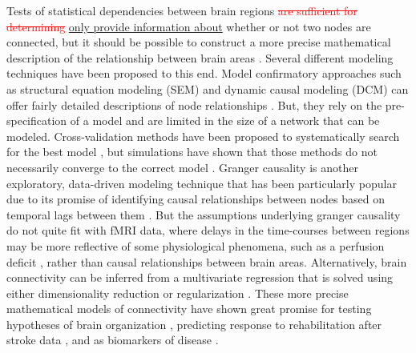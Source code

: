 \documentclass{bmcart}
\newcommand{\ADDED}[1]{\textcolor{markercolor}{\uline{#1}}}
\newcommand{\DELETED}[1]{\textcolor{red}{\sout{#1}}}
\begin{document}
Tests of statistical dependencies between brain regions \DELETED{are sufficient for determining} \ADDED{only provide information about} whether or not two nodes are connected, but it should be possible to construct a more precise mathematical description of the relationship between brain areas \cite{Friston1994}. Several different modeling techniques have been proposed to this end. Model confirmatory approaches such as structural equation modeling (SEM) \cite{Buchel1997} and dynamic causal modeling (DCM) \cite{Friston2003} can offer fairly detailed descriptions of node relationships . But, they rely on the pre-specification of a model and are limited in the size of a network that can be modeled. Cross-validation methods have been proposed to systematically search for the best model \cite{Zhuang2005,Penny2010,James2009}, but simulations have shown that those methods do not necessarily converge to the correct model \cite{Lohmann2012}. Granger causality is another exploratory, data-driven modeling technique that has been particularly popular due to its promise of identifying causal relationships between nodes based on temporal lags between them \cite{Deshpande2011}. But the assumptions underlying granger causality do not quite fit with fMRI data\cite{Smith2011}, where delays in the time-courses between regions may be more reflective of some physiological phenomena, such as a perfusion deficit \cite{Lv2013}, rather than causal relationships between brain areas. Alternatively, brain connectivity can be inferred from a multivariate regression  that is solved using either dimensionality reduction \cite{Friston1994} or regularization \cite{Craddock2013b}. These more precise mathematical models of connectivity have shown great promise for testing hypotheses of brain organization \cite{Craddock2013b}, predicting response to rehabilitation after stroke data \cite{James2009b}, and as biomarkers of disease \cite{Brodersen2011}.
\end{document}
